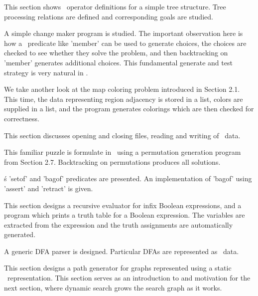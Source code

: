 This section shows \prolog\ operator definitions for a simple tree structure. Tree
processing relations are defined and corresponding goals are studied.

 
 

A simple change maker program is studied. The important observation here is how
a \prolog\ predicate like 'member' can be used to generate choices, the choices
are checked to see whether they solve the problem, and then backtracking on
'member' generates additional choices. This fundamental generate and test
strategy is very natural in \prolog.


We take another look at the map coloring problem introduced in Section 2.1. This
time, the data representing region adjacency is stored in a list, colors are
supplied in a list, and the program generates colorings which are then checked
for correctness.


This section discusses opening and closing files, reading and writing of \prolog\
data.
 

This familiar puzzle is formulate in \prolog\ using a permutation generation
program from Section 2.7. Backtracking on permutations produces all solutions.
 

\prolog\'s 'setof' and 'bagof' predicates are presented. An implementation of
'bagof' using 'assert' and 'retract' is given.


This section designs a recursive evaluator for infix Boolean expressions, and a
program which prints a truth table for a Boolean expression. The variables are
extracted from the expression and the truth assignments are automatically
generated.


A generic DFA parser is designed. Particular DFAs are represented as \prolog\
data.
 

This section designs a path generator for graphs represented using a static
\prolog\ representation. This section serves as an introduction to and motivation
for the next section, where dynamic search grows the search graph as it works.
 
